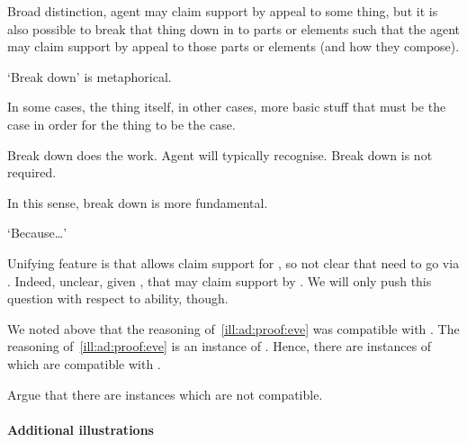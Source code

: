 \begin{note}
  Broad distinction, agent may claim support by appeal to some thing, but it is also possible to break that thing down in to parts or elements such that the agent may claim support by appeal to those parts or elements (and how they compose).

  `Break down' is metaphorical.

  In some cases, the thing itself, in other cases, more basic stuff that must be the case in order for the thing to be the case.

  Break down does the work.
  Agent will typically recognise.
  Break down is not required.

  In this sense, break down is more fundamental.

  `Because\dots'

  Unifying feature is that \adA{} allows claim support for \adB{}, so not clear that need to go via \adB{}.
  Indeed, unclear, given \ESU{}, that may claim support by \adB{}.
  We will only push this question with respect to ability, though.
\end{note}

\begin{note}[\ESU{}]
  We noted above that the reasoning of~\ref{ill:ad:proof:eve} was compatible with \ESU{}.
  The reasoning of~\ref{ill:ad:proof:eve} is an instance of \adB{}.
  Hence, there are instances of \adB{} which are compatible with \ESU{}.

  Argue that there are instances which are not compatible.
\end{note}

\paragraph{Additional illustrations}

